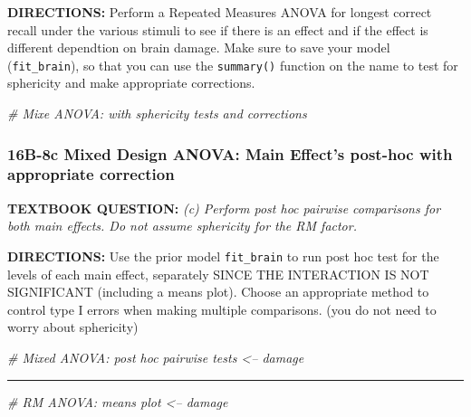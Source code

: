 \documentclass[]{article}
\newenvironment{Shaded}{\begin{snugshade}}{\end{snugshade}}
\newcommand{\CommentTok}[1]{\textcolor[rgb]{0.56,0.35,0.01}{\textit{#1}}}
\begin{document}
\textbf{DIRECTIONS:} Perform a Repeated Measures ANOVA for longest
correct recall under the various stimuli to see if there is an effect
and if the effect is different dependtion on brain damage. Make sure to
save your model (\texttt{fit\_brain}), so that you can use the
\texttt{summary()} function on the name to test for sphericity and make
appropriate corrections.

\begin{Shaded}
\begin{Highlighting}[]
\CommentTok{# Mixe ANOVA:  with sphericity tests and corrections}
\end{Highlighting}
\end{Shaded}

\clearpage

\subsubsection{16B-8c Mixed Design ANOVA: Main Effect's post-hoc with
appropriate
correction}\label{b-8c-mixed-design-anova-main-effects-post-hoc-with-appropriate-correction}

\textbf{TEXTBOOK QUESTION:} \emph{(c) Perform post hoc pairwise
comparisons for both main effects. Do not assume sphericity for the RM
factor.}

\textbf{DIRECTIONS:} Use the prior model \texttt{fit\_brain} to run post
hoc test for the levels of each main effect, separately SINCE THE
INTERACTION IS NOT SIGNIFICANT (including a means plot). Choose an
appropriate method to control type I errors when making multiple
comparisons. (you do not need to worry about sphericity)

\begin{Shaded}
\begin{Highlighting}[]
\CommentTok{# Mixed ANOVA: post hoc pairwise tests <-- damage}
\end{Highlighting}
\end{Shaded}

\begin{center}\rule{0.5\linewidth}{\linethickness}\end{center}

\begin{Shaded}
\begin{Highlighting}[]
\CommentTok{# RM ANOVA: means plot <-- damage}
\end{Highlighting}
\end{Shaded}

\clearpage
\end{document}
